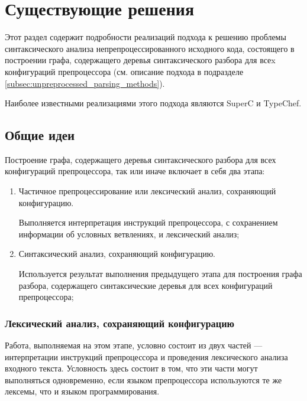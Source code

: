 \clearpage

\section{Существующие решения}

Этот раздел содержит подробности реализаций подхода к решению проблемы синтаксического анализа непрепроцессированного исходного кода, состоящего в построении графа, содержащего деревья синтаксического разбора для всеx конфигураций препроцессора (см. описание подхода в подразделе \ref{subsec:unpreprocessed_parsing_methods}).

Наиболее известными реализациями этого подхода являются SuperC\cite{superc} и TypeChef\cite{typechef}.

\subsection{Общие идеи}
\label{subsec:commonideas}

Построение графа, содержащего деревья синтаксического разбора для всех конфигураций препроцессора, так или иначе включает в себя два этапа:

\begin{enumerate}

\item Частичное препроцессирование или лексический анализ, сохраняющий конфигурацию.

Выполняется интерпретация инструкций препроцессора, с сохранением информации об условных ветвлениях, и лексический анализ;
\item Синтаксический анализ, сохраняющий конфигурацию.

Используется результат выполнения предыдущего этапа для построения графа разбора, содержащего синтаксические деревья для всех конфигураций препроцессора;

\end{enumerate} 

\subsubsection{Лексический анализ, сохраняющий конфигурацию}
\label{subsubsec:configurationpreservinglexing}

Работа, выполняемая на этом этапе, условно состоит из двух частей --- интерпретации инструкций препроцессора и проведения лексического анализа входного текста. Условность здесь состоит в том, что эти части могут выполняться одновременно, если языком препроцессора используются те же лексемы, что и языком программирования.

